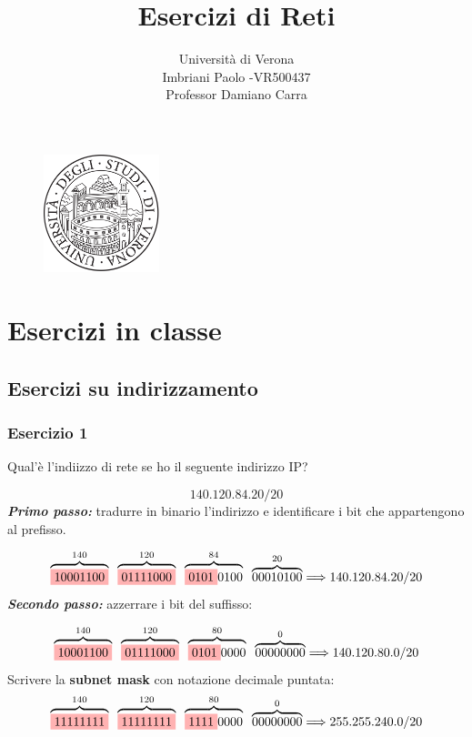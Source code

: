 \documentclass[12pt]{article}
\title{Esercizi di Reti}
\author{Università di Verona\\Imbriani Paolo -VR500437\\Professor Damiano Carra}
\begin{document}
\begin{figure}
    \centering
    \includegraphics[width=0.3\textwidth]{UniversityofVerona.png}
    \label{fig:centered-image}
\end{figure}

\maketitle 

\pagebreak

\tableofcontents

\pagebreak

\section{Esercizi in classe}

\subsection{Esercizi su indirizzamento}

\subsubsection{Esercizio 1}

Qual'è l'indiizzo di rete se ho il seguente indirizzo IP?

\[140.120.84.20/20\]
\textbf{\textit{Primo passo:}} tradurre in binario l'indirizzo e identificare i bit che appartengono al prefisso.

\[\overbrace{\colorbox{red!30!white}{10001100}}^{140} \; \; \overbrace{\colorbox{red!30!white}{01111000}}^{120} \; \; \overbrace{\colorbox{red!30!white}{0101}0100}^{84} \; \; \overbrace{00010100}^{20} \Longrightarrow 140.120.84.20/20\]
\textbf{\textit{Secondo passo:}} azzerrare i bit del suffisso:

\[\overbrace{\colorbox{red!30!white}{10001100}}^{140} \; \; \overbrace{\colorbox{red!30!white}{01111000}}^{120} \; \; \overbrace{\colorbox{red!30!white}{0101}0000}^{80} \; \; \overbrace{00000000}^{0} \Longrightarrow 140.120.80.0/20\]
Scrivere la\textbf{ subnet mask} con notazione decimale puntata:
\[\overbrace{\colorbox{red!30!white}{11111111}}^{140} \; \; \overbrace{\colorbox{red!30!white}{11111111}}^{120} \; \; \overbrace{\colorbox{red!30!white}{1111}0000}^{80} \; \; \overbrace{00000000}^{0} \Longrightarrow 255.255.240.0/20\]
\end{document}
